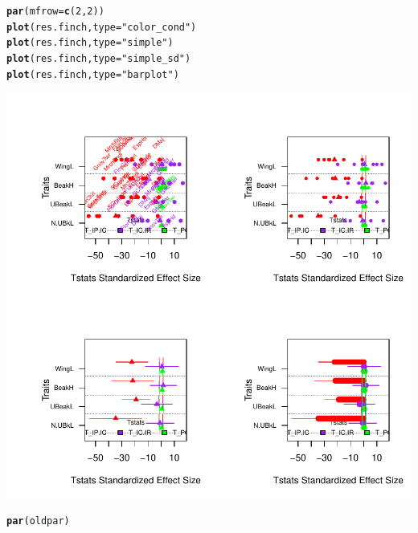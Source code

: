 \documentclass[12pt]{article}\usepackage[]{graphicx}\usepackage[]{color}
\makeatletter
\def\maxwidth{ %
  \ifdim\Gin@nat@width>\linewidth
    \linewidth
  \else
    \Gin@nat@width
  \fi
}
\newcommand{\hlnum}[1]{\textcolor[rgb]{0.686,0.059,0.569}{#1}}%
\newcommand{\hlstr}[1]{\textcolor[rgb]{0.192,0.494,0.8}{#1}}%
\newcommand{\hlstd}[1]{\textcolor[rgb]{0.345,0.345,0.345}{#1}}%
\newcommand{\hlkwc}[1]{\textcolor[rgb]{0.333,0.667,0.333}{#1}}%
\newcommand{\hlkwd}[1]{\textcolor[rgb]{0.737,0.353,0.396}{\textbf{#1}}}%
\newenvironment{kframe}{%
 \def\at@end@of@kframe{}%
 \ifinner\ifhmode%
  \def\at@end@of@kframe{\end{minipage}}%
  \begin{minipage}{\columnwidth}%
 \fi\fi%
 \def\FrameCommand##1{\hskip\@totalleftmargin \hskip-\fboxsep
 \colorbox{shadecolor}{##1}\hskip-\fboxsep
     \hskip-\linewidth \hskip-\@totalleftmargin \hskip\columnwidth}%
 \MakeFramed {\advance\hsize-\width
   \@totalleftmargin\z@ \linewidth\hsize
   \@setminipage}}%
 {\par\unskip\endMakeFramed%
 \at@end@of@kframe}
\newenvironment{knitrout}{}{} %
\makeatother
\begin{document}
\begin{knitrout}
\color{fgcolor}\begin{kframe}
\begin{alltt}
\hlkwd{par}\hlstd{(}\hlkwc{mfrow} \hlstd{=} \hlkwd{c}\hlstd{(}\hlnum{2}\hlstd{,} \hlnum{2}\hlstd{))}
\hlkwd{plot}\hlstd{(res.finch,} \hlkwc{type} \hlstd{=} \hlstr{"color_cond"}\hlstd{)}
\hlkwd{plot}\hlstd{(res.finch,} \hlkwc{type} \hlstd{=} \hlstr{"simple"}\hlstd{)}
\hlkwd{plot}\hlstd{(res.finch,} \hlkwc{type} \hlstd{=} \hlstr{"simple_sd"}\hlstd{)}
\hlkwd{plot}\hlstd{(res.finch,} \hlkwc{type} \hlstd{=} \hlstr{"barplot"}\hlstd{)}
\end{alltt}
\end{kframe}

{\centering \includegraphics[width=\maxwidth]{figure/unnamed-chunk-22} 

}


\begin{kframe}\begin{alltt}
\hlkwd{par}\hlstd{(oldpar)}
\end{alltt}
\end{kframe}
\end{knitrout}


\newpage
\end{document}

